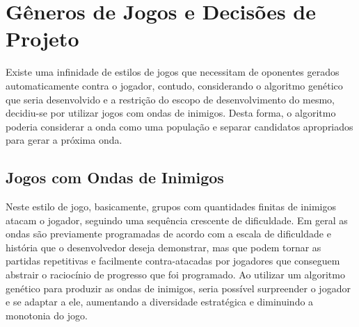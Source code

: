 








\chapter{Gêneros de Jogos e Decisões de Projeto}
\label{cap:generos-decisoes}

Existe uma infinidade de estilos de jogos que necessitam de oponentes gerados automaticamente contra o jogador, contudo, considerando o algoritmo genético que seria desenvolvido e a restrição do escopo de desenvolvimento do mesmo, decidiu-se por utilizar jogos com ondas de inimigos. Desta forma, o algoritmo poderia considerar a onda como uma população e separar candidatos apropriados para gerar a próxima onda.

\section{Jogos com Ondas de Inimigos}
\label{sec:jogos-ondas}

Neste estilo de jogo, basicamente, grupos com quantidades finitas de inimigos atacam o jogador, seguindo uma sequência crescente de dificuldade. Em geral as ondas são previamente programadas de acordo com a escala de dificuldade e história que o desenvolvedor deseja demonstrar, mas que podem tornar as partidas repetitivas e facilmente contra-atacadas por jogadores que conseguem abstrair o raciocínio de progresso que foi programado. Ao utilizar um algoritmo genético para produzir as ondas de inimigos, seria possível surpreender o jogador e se adaptar a ele, aumentando a diversidade estratégica e diminuindo a monotonia do jogo.

